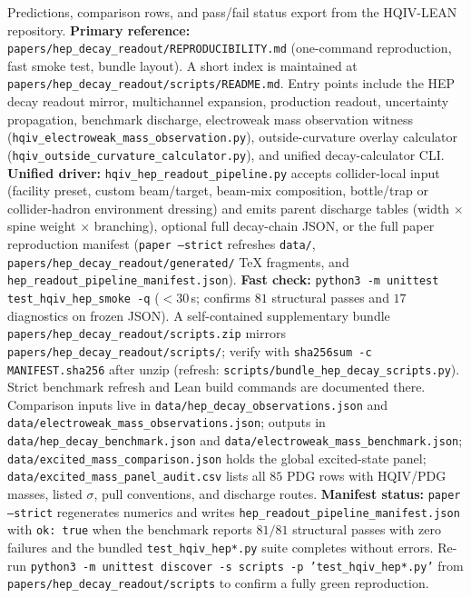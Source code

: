 \documentclass[11pt]{amsart}
\newcommand{\repath}[1]{{\scriptsize\nolinkurl{#1}}}
\begin{document}
Predictions, comparison rows, and pass/fail status export from the HQIV-LEAN
repository.
\textbf{Primary reference:} \repath{papers/hep_decay_readout/REPRODUCIBILITY.md}
(one-command reproduction, fast smoke test, bundle layout).
A short index is maintained at \repath{papers/hep_decay_readout/scripts/README.md}.
Entry points include the HEP decay readout mirror, multichannel expansion,
production readout, uncertainty propagation, benchmark discharge, electroweak mass
observation witness (\repath{hqiv_electroweak_mass_observation.py}), outside-curvature
overlay calculator (\repath{hqiv_outside_curvature_calculator.py}), and unified
decay-calculator CLI.
\textbf{Unified driver:} \repath{hqiv_hep_readout_pipeline.py} accepts
collider-local input (facility preset, custom beam/target, beam-mix composition,
bottle/trap or collider-hadron environment dressing) and emits parent discharge
tables (width $\times$ spine weight $\times$ branching), optional full decay-chain
JSON, or the full paper reproduction manifest
(\texttt{paper --strict} refreshes \repath{data/}, \repath{papers/hep_decay_readout/generated/} TeX fragments, and
\repath{hep_readout_pipeline_manifest.json}).
\textbf{Fast check:} \texttt{python3 -m unittest test\_hqiv\_hep\_smoke -q}
($<30$\,s; confirms $81$ structural passes and $17$ diagnostics on frozen JSON).
A self-contained supplementary bundle \repath{papers/hep_decay_readout/scripts.zip}
mirrors \repath{papers/hep_decay_readout/scripts/}; verify with
\texttt{sha256sum -c MANIFEST.sha256} after unzip (refresh:
\repath{scripts/bundle_hep_decay_scripts.py}).
Strict benchmark refresh and Lean build commands are documented there.
Comparison inputs live in \repath{data/hep_decay_observations.json} and
\repath{data/electroweak_mass_observations.json}; outputs in
\repath{data/hep_decay_benchmark.json} and
\repath{data/electroweak_mass_benchmark.json};
\repath{data/excited_mass_comparison.json} holds the global excited-state panel;
\repath{data/excited_mass_panel_audit.csv} lists all $85$ PDG rows with HQIV/PDG masses,
listed $\sigma$, pull conventions, and discharge routes.
\textbf{Manifest status:} \texttt{paper --strict} regenerates numerics and writes
\repath{hep_readout_pipeline_manifest.json} with \texttt{ok: true} when the
benchmark reports $81/81$ structural passes with zero failures and the bundled
\texttt{test\_hqiv\_hep*.py} suite completes without errors.
Re-run \texttt{python3 -m unittest discover -s scripts -p 'test\_hqiv\_hep*.py'}
from \repath{papers/hep_decay_readout/scripts} to confirm a fully green reproduction.
\end{document}

